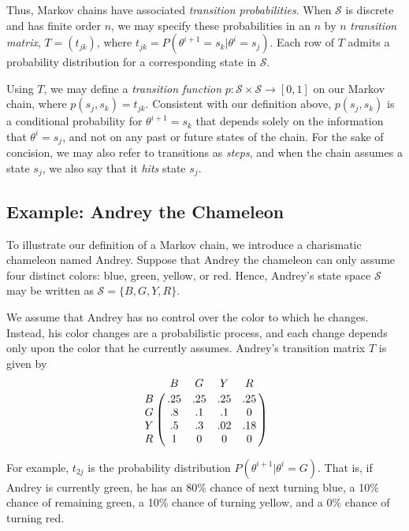 \documentclass[12pt,twoside]{reedthesis}
\begin{document}
			Thus, Markov chains have associated {\em transition probabilities}. When $\mathcal S$ is discrete and has finite order $n$, we may specify these probabilities in an $n$ by $n$ {\em transition matrix}, $T = (t_{jk})$, where $t_{jk} = P(\theta^{i+1} = s_k | \theta^{i} = s_j)$. Each row of $T$ admits a probability distribution for a corresponding state in $\mathcal S$. 
			
			Using $T$, we may define a {\em transition function} $p: \mathcal{S}\times\mathcal{S} \rightarrow [0,1]$ on our Markov chain, where $p(s_j,s_k) = t_{jk}$. Consistent with our definition above, $p(s_j,s_k)$ is a conditional probability for $\theta^{i + 1} = s_k$ that depends solely on the information that $\theta^{i} = s_j$, and not on any past or future states of the chain. For the sake of concision, we may also refer to transitions as {\em steps}, and when the chain assumes a state $s_j$, we also say that it {\em hits} state $s_j$. 
			
	 
	\subsection*{Example: Andrey the Chameleon}
	To illustrate our definition of a Markov chain, we introduce a charismatic chameleon named Andrey. 
	Suppose that Andrey the chameleon can only assume four distinct colors: blue, green, yellow, or red. Hence, Andrey's state space $\mathcal S$ may be written as $\mathcal{S} = \{B, G, Y, R\}$. 
	
	We assume that Andrey has no control over the color to which he changes. Instead, his color changes are a probabilistic process, and each change depends only upon the color that he currently assumes. Andrey's transition matrix $T$ is given by
$$
\bordermatrix{ ~ & B & G & Y & R \cr
	                     B & .25 & .25 & .25 & .25 \cr
	                     G & .8 & .1 & .1 & 0 \cr
	                     Y & .5 & .3 & .02 & .18 \cr
	                     R & 1 & 0 & 0 & 0 \cr	                     	                     	                     
}
$$
	
	For example, $t_{2j}$ is the probability distribution $P(\theta^{i+1} | \theta^i = G)$. That is, if Andrey is currently green, he has an 80\% chance of next turning blue, a 10\% chance of remaining green, a 10\% chance of turning yellow, and a 0\% chance of turning red. 
	
\end{document}
